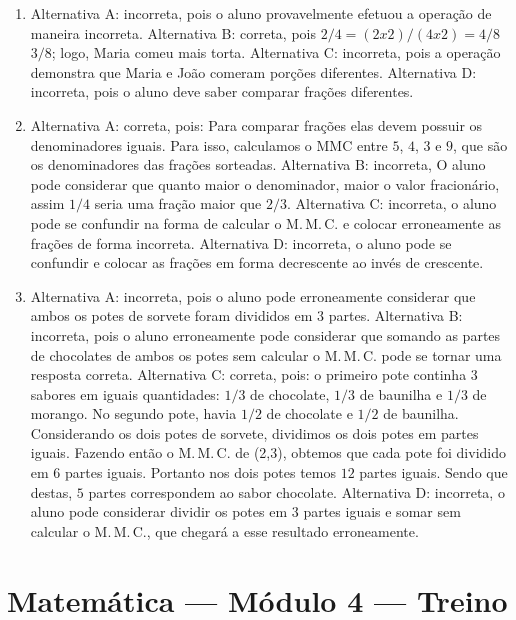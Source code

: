\begin{enumerate}
\item Alternativa A: incorreta, pois o aluno provavelmente efetuou a operação
de maneira incorreta.
Alternativa B: correta, pois $2/4 = (2 x 2) / (4 x 2) = 4/8$
$3/8$; logo, Maria comeu mais torta.
Alternativa C: incorreta, pois a operação demonstra que Maria e João
comeram porções diferentes.
Alternativa D: incorreta, pois o aluno deve saber comparar frações
diferentes.

\item Alternativa A: correta, pois: Para comparar frações elas devem possuir os denominadores iguais. Para isso, calculamos o MMC entre $5$, $4$, $3$ e $9$, que são os denominadores das frações sorteadas.
Alternativa B: incorreta, O aluno pode considerar que quanto maior o
denominador, maior o valor fracionário, assim $1/4$ seria uma fração maior
que $2/3$.
Alternativa C: incorreta, o aluno pode se confundir na forma de calcular
o M.\,M.\,C. e colocar erroneamente as frações de forma incorreta.
Alternativa D: incorreta, o aluno pode se confundir e colocar as frações
em forma decrescente ao invés de crescente.

\item Alternativa A: incorreta, pois o aluno pode erroneamente considerar que
ambos os potes de sorvete foram divididos em $3$ partes.
Alternativa B: incorreta, pois o aluno erroneamente pode considerar que
somando as partes de chocolates de ambos os potes sem calcular o M.\,M.\,C.
pode se tornar uma resposta correta.
Alternativa C: correta, pois: o primeiro pote continha $3$ sabores em
iguais quantidades: $1/3$ de chocolate, $1/3$ de baunilha e $1/3$ de morango.
No segundo pote, havia $1/2$ de chocolate e $1/2$ de baunilha. Considerando
os dois potes de sorvete, dividimos os dois potes em partes iguais.
Fazendo então o M.\,M.\,C. de (2,3), obtemos que cada pote foi dividido em $6$
partes iguais. Portanto nos dois potes temos $12$ partes iguais. Sendo que
destas, $5$ partes correspondem ao sabor chocolate.
Alternativa D: incorreta, o aluno pode considerar dividir os potes em $3$
partes iguais e somar sem calcular o M.\,M.\,C., que chegará a esse
resultado erroneamente.
\end{enumerate}

\section*{Matemática — Módulo 4 — Treino}

